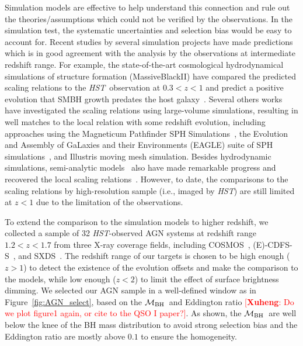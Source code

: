 \documentclass{natureprintstyle}
\newcommand{\hst}{{\it HST}}
\newcommand{\mbh}{$\mathcal M_{\rm BH}$}
\newcommand{\ding}[1]{\textcolor{red}{[{\bf Xuheng}: #1]}}
\begin{document}
Simulation models are effective to help understand this connection and rule out the theories/assumptions which could not be verified by the observations. In the simulation test, the systematic uncertainties and selection bias would be easy to account for. Recent studies by several simulation projects have made predictions which is in good agreement with the analysis by the observations at intermediate redshift range. For example, the state-of-the-art cosmological hydrodynamical simulations of structure formation (MassiveBlackII) have compared the predicted scaling relations to the \hst\ observation at $0.3<z<1$ and predict a positive evolution that SMBH growth predates the host galaxy~\cite{DeG++15}. Several others works have investigated the scaling relations using large-volume simulations, resulting in well matches to the local relation with some redshift evolution, including approaches using the Magneticum Pathfinder SPH Simulations~\cite{Steinborn2015}, the Evolution and Assembly of GaLaxies and their Environments (EAGLE) suite of SPH simulations~\cite{Schaye2015}, and Illustris moving mesh simulation\cite{Sijacki2015, Vogelsberger2014}. Besides hydrodynamic simulations, semi-analytic models~\cite{Menci2014, Menci2016} also have made remarkable progress and recovered the local scaling relations~\cite{Kormendy13}. However, to date, the comparisons to the scaling relations by high-resolution sample (i.e., imaged by \hst) are still limited at $z<1$ due to the limitation of the observations.

To extend the comparison to the simulation models to higher redshift, we collected a sample of 32 \hst-observed AGN systems at redshift range $1.2<z<1.7$ from three X-ray coverage fields, including COSMOS~\cite{Civano2016}, (E)-CDFS-S~\cite{Lehmer2005, Xue2011}, and SXDS~\cite{Ueda2008}. The redshift range of our targets is chosen to be high enough ($z>1$) to detect the existence of the evolution offsets and make the comparison to the models, while low enough ($z<2$) to limit the effect of surface brightness dimming. We selected our AGN sample in a well-defined window as in Figure~\ref{fig:AGN_select}, based on the \mbh\ and Eddington ratio \ding{Do we plot figure1 again, or cite to the QSO I paper?}. As shown, the \mbh\ are well below the knee of the BH mass distribution to avoid strong selection bias and the Eddington ratio are mostly above $0.1$ to ensure the homogeneity.
\end{document}

